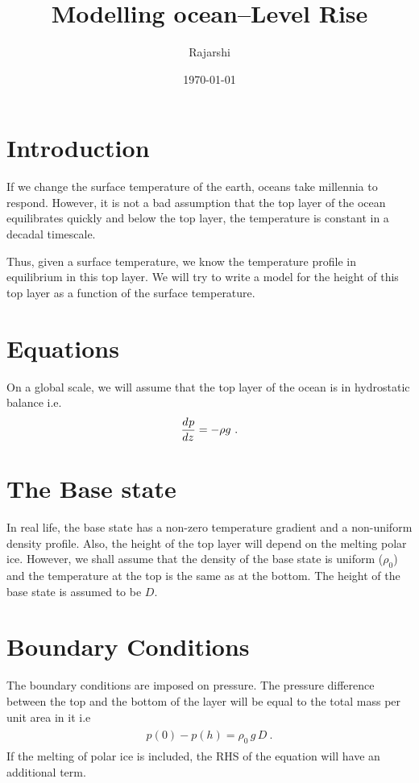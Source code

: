 \documentclass[fontsize = 13pt]{scrartcl}
\title{Modelling ocean--Level Rise}
\author{Rajarshi}
\date{\today}
\begin{document}
\maketitle
\tableofcontents
\pagebreak
\section{Introduction}
If we change the surface temperature of the earth, oceans take millennia to respond. However, it is not a bad assumption that the top layer of the ocean equilibrates quickly and below the top layer, the temperature is constant in a decadal timescale.

Thus, given a surface temperature, we know the temperature profile in equilibrium in this top layer. We will try to write a model for the height of this top layer as a function of the surface temperature. 

\section{Equations}
On a global scale, we will assume that the top layer of the ocean is in hydrostatic balance i.e.
\begin{align}
\begin{split}
    \frac{d^{} p}{d z^{}} = - \rho g \ .
\end{split}
\end{align}
\section{The Base state}
In real life, the base state has a non-zero temperature gradient and a non-uniform density profile. Also, the height of the top layer will depend on the melting polar ice. 
However, we shall assume that the density of the base state is uniform (\(\rho_0\)) and the temperature at the top is the same as at the bottom. The height of the base state is assumed to be \(D\).
\section{Boundary Conditions}
The boundary conditions are imposed on pressure. The pressure difference between the top and the bottom of the layer will be equal to the total mass
per unit area in it i.e 
\begin{align}
\begin{split}
    p(0) - p(h) = \rho_0\,g\,D \ .
\end{split}
\end{align}
If the melting of polar ice is included, the RHS of the equation will have an additional term.
\end{document}
